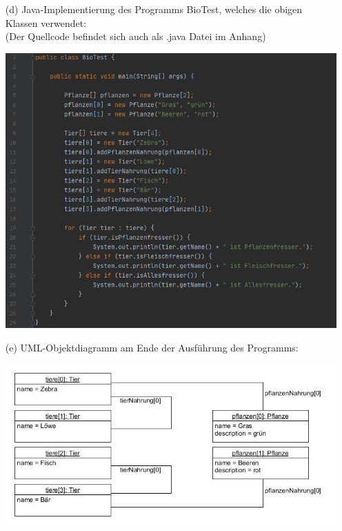 \documentclass[12pt]{article}
\begin{document}
\begin{enumerate}
	\item[(d)] Java-Implementierung des Programms BioTest, welches die obigen Klassen verwendet: \\
	(Der Quellcode befindet sich auch als .java Datei im Anhang)
	\begin{center}
		\includegraphics[scale=.7]{Quellcode_BioTest.png}
	\end{center}
	
	\item[(e)] UML-Objektdiagramm am Ende der Ausführung des Programms:
	\begin{center}
		\includegraphics[scale=.5]{OMP_Blatt01_Weerts_Objektdiagramm.jpg}
	\end{center}
\end{enumerate}
\end{document}
